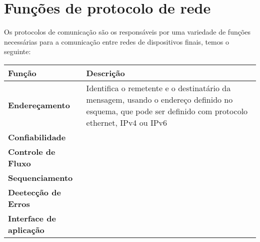 \documentclass[12pt a4paper]{paper}
\begin{document}
\section{Funções de protocolo de rede} %
\label{sec:Funções de protocolo de rede}
Os protocolos de comunicação são os responsáveis por uma variedade de funções 
necessárias para a comunicação entre redes de dispositivos finais, temos o seguinte: 

\begin{center}
  \begin{tabular}{ | m{3cm} | m{7cm} |}
\hline
\textbf{Função} & \textbf{Descrição} \\
\hline
\textbf{Endereçamento} & Identifica  o remetente e o destinatário da mensagem, usando o endereço definido no esquema, que pode ser definido com protocolo ethernet, IPv4 ou IPv6\\
\textbf{Confiabilidade} \\
\textbf{Controle de Fluxo} \\
\textbf{Sequenciamento} \\
\textbf{Deetecção de Erros } \\
\textbf{Interface de aplicação} \\
\end{tabular}
\end{center}






\end{document}
